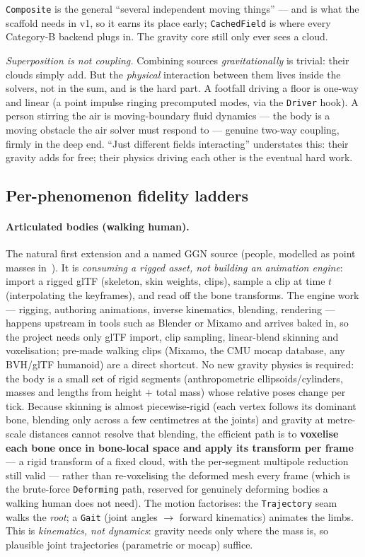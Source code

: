\documentclass[11pt,a4paper]{article}
\theoremstyle{reqstyle}
\begin{document}
\texttt{Composite} is the general ``several independent moving things'' --- and is what the
scaffold needs in v1, so it earns its place early; \texttt{CachedField} is where every
Category-B backend plugs in. The gravity core still only ever sees a cloud.

\emph{Superposition is not coupling.} Combining sources \emph{gravitationally} is trivial:
their clouds simply add. But the \emph{physical} interaction between them lives inside the
solvers, not in the sum, and is the hard part. A footfall driving a floor is one-way and
linear (a point impulse ringing precomputed modes, via the \texttt{Driver} hook). A person
stirring the air is moving-boundary fluid dynamics --- the body is a moving obstacle the air
solver must respond to --- genuine two-way coupling, firmly in the deep end. ``Just different
fields interacting'' understates this: their gravity adds for free; their physics driving each
other is the eventual hard work.

\subsection{Per-phenomenon fidelity ladders}

\paragraph{Articulated bodies (walking human).} The natural first extension and a named GGN
source (people, modelled as point masses in~\cite{carlton2023}). It is \emph{consuming a
rigged asset, not building an animation engine}: import a rigged glTF (skeleton, skin weights,
clips), sample a clip at time $t$ (interpolating the keyframes), and read off the bone
transforms. The engine work --- rigging, authoring animations, inverse kinematics, blending,
rendering --- happens upstream in tools such as Blender or Mixamo and arrives baked in, so the
project needs only glTF import, clip sampling, linear-blend skinning and voxelisation;
pre-made walking clips (Mixamo, the CMU mocap database, any BVH/glTF humanoid) are a direct
shortcut. No new gravity physics is required: the body is a small set of rigid segments
(anthropometric ellipsoids/cylinders, masses and lengths from height $+$ total mass) whose
relative poses change per tick. Because skinning is almost piecewise-rigid (each vertex
follows its dominant bone, blending only across a few centimetres at the joints) and gravity
at metre-scale distances cannot resolve that blending, the efficient path is to \textbf{voxelise
each bone once in bone-local space and apply its transform per frame} --- a rigid transform of
a fixed cloud, with the per-segment multipole reduction still valid --- rather than
re-voxelising the deformed mesh every frame (which is the brute-force \texttt{Deforming} path,
reserved for genuinely deforming bodies a walking human does not need). The motion factorises:
the \texttt{Trajectory} seam walks the \emph{root}; a \texttt{Gait} (joint angles $\to$ forward
kinematics) animates the limbs. This is \emph{kinematics, not dynamics}: gravity needs only
where the mass is, so plausible joint trajectories (parametric or mocap) suffice.
\end{document}
